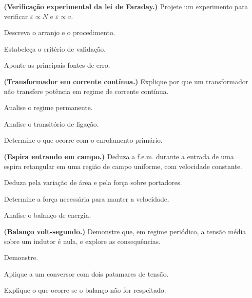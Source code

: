 \begin{questao}[4]{}

\textbf{(Verificação experimental da lei de Faraday.)} Projete um experimento
para verificar $\varepsilon\propto N$ e $\varepsilon\propto v$.
\begin{itensq}
\item Descreva o arranjo e o procedimento.
\item Estabeleça o critério de validação.
\item Aponte as principais fontes de erro.
\end{itensq}


\end{questao}
\begin{questao}[4]{}

\textbf{(Transformador em corrente contínua.)} Explique por que um
transformador não transfere potência em regime de corrente contínua.
\begin{itensq}
\item Analise o regime permanente.
\item Analise o transitório de ligação.
\item Determine o que ocorre com o enrolamento primário.
\end{itensq}


\end{questao}
\begin{questao}[4]{}

\textbf{(Espira entrando em campo.)} Deduza a f.e.m. durante a entrada de uma
espira retangular em uma região de campo uniforme, com velocidade constante.
\begin{itensq}
\item Deduza pela variação de área e pela força sobre portadores.
\item Determine a força necessária para manter a velocidade.
\item Analise o balanço de energia.
\end{itensq}


\end{questao}
\begin{questao}[4]{}

\textbf{(Balanço volt-segundo.)} Demonstre que, em regime periódico, a tensão
média sobre um indutor é nula, e explore as consequências.
\begin{itensq}
\item Demonstre.
\item Aplique a um conversor com dois patamares de tensão.
\item Explique o que ocorre se o balanço não for respeitado.
\end{itensq}


\end{questao}
